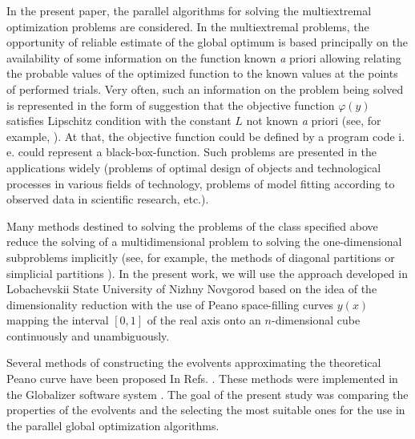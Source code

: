 \documentclass[runningheads]{llncs}
\begin{document}
In the present paper, the parallel algorithms for solving the multiextremal optimization problems
are considered. In the multiextremal problems, the opportunity of reliable estimate of the global
optimum is based principally on the availability of some information on the function known
{\textit a priori} allowing relating the probable values of the optimized function to the known
values at the points of performed trials. Very often, such an information on the problem being
solved is represented in the form of suggestion that the objective function $\varphi(y)$ satisfies
Lipschitz condition with the constant $L$ not known {\textit a priori} (see, for example,
\cite{Jones,Gablonsky,Evtushenko}). At that, the objective function could be defined by a
program code i. e. could represent a black-box-function. Such problems are presented in the
applications widely (problems of optimal design of objects and technological processes in
various fields of technology, problems of model fitting according to observed data in scientific
research, etc.).

Many methods destined to solving the problems of the class specified above reduce the solving
of a multidimensional problem to solving the one-dimensional subproblems implicitly (see, for
example, the methods of diagonal partitions \cite{Sergeyev2006,SergeyevKvasov2015} or
simplicial partitions \cite{Zilinskas2008,Zilinskas2014}). In the present work, we will use the
approach developed in Lobachevskii State University of Nizhny Novgorod based on the idea of
the dimensionality reduction with the use of Peano space-filling curves $y(x)$ mapping the
interval $[0,1]$ of the real axis onto an $n$-dimensional cube continuously and unambiguously.

Several methods of constructing the evolvents approximating the theoretical Peano curve have
been proposed In Refs. \cite{strongin1978,Strongin1992,Gergel2009,Goryachih2017}. These
methods were implemented in the Globalizer software system \cite{globalizerSystem}. The goal
of the present study was comparing the properties of the evolvents and the selecting the most
suitable ones for the use in the parallel global optimization algorithms.

\end{document}
